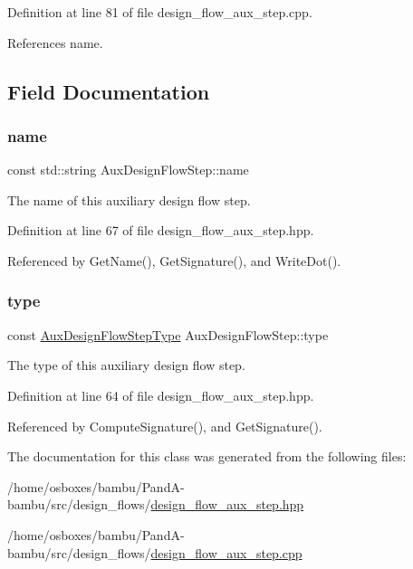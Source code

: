 Definition at line 81 of file design\+\_\+flow\+\_\+aux\+\_\+step.\+cpp.



References name.



\subsection{Field Documentation}
\mbox{\label{classAuxDesignFlowStep_af8d85f43fd8f5fad0e80d45dcb43105c}} 
\subsubsection{\texorpdfstring{name}{name}}
{\footnotesize\ttfamily const std\+::string Aux\+Design\+Flow\+Step\+::name\hspace{0.3cm}{\ttfamily [private]}}



The name of this auxiliary design flow step. 



Definition at line 67 of file design\+\_\+flow\+\_\+aux\+\_\+step.\+hpp.



Referenced by Get\+Name(), Get\+Signature(), and Write\+Dot().

\mbox{\label{classAuxDesignFlowStep_abd729d912bc25066e2508f244b6eed8d}} 
\subsubsection{\texorpdfstring{type}{type}}
{\footnotesize\ttfamily const \hyperlink{design__flow__aux__step_8hpp_a11050839fc7a6c59f7ec7eb2d1f1568b}{Aux\+Design\+Flow\+Step\+Type} Aux\+Design\+Flow\+Step\+::type\hspace{0.3cm}{\ttfamily [private]}}



The type of this auxiliary design flow step. 



Definition at line 64 of file design\+\_\+flow\+\_\+aux\+\_\+step.\+hpp.



Referenced by Compute\+Signature(), and Get\+Signature().



The documentation for this class was generated from the following files\+:\begin{DoxyCompactItemize}
\item 
/home/osboxes/bambu/\+Pand\+A-\/bambu/src/design\+\_\+flows/\hyperlink{design__flow__aux__step_8hpp}{design\+\_\+flow\+\_\+aux\+\_\+step.\+hpp}\item 
/home/osboxes/bambu/\+Pand\+A-\/bambu/src/design\+\_\+flows/\hyperlink{design__flow__aux__step_8cpp}{design\+\_\+flow\+\_\+aux\+\_\+step.\+cpp}\end{DoxyCompactItemize}
